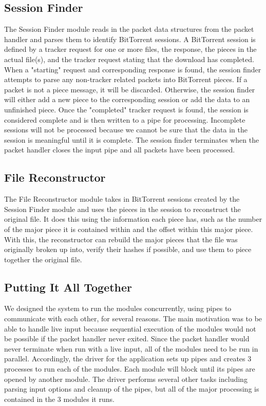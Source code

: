 \documentclass{acm_proc_article-sp}
\begin{document}
\subsection{Session Finder}
The Session Finder module reads in the packet data structures from the packet
handler and parses them to identify BitTorrent sessions. A BitTorrent session is
defined by a tracker request for one or more files, the response, the pieces in
the actual file(s), and the tracker request stating that the download has
completed. When a "starting" request and corresponding response is found, the
session finder attempts to parse any non-tracker related packets into BitTorrent
pieces. If a packet is not a piece message, it will be discarded. Otherwise, the
session finder will either add a new piece to the corresponding session or add
the data to an unfinished piece. Once the "completed" tracker request is found,
the session is considered complete and is then written to a pipe for
processing. Incomplete sessions will not be processed because we cannot be sure
that the data in the session is meaningful until it is complete. The session
finder terminates when the packet handler closes the input pipe and all packets
have been processed.

\subsection{File Reconstructor}
The File Reconstructor module takes in BitTorrent sessions created by the
Session Finder module and uses the pieces in the session to reconstruct the
original file.  It does this using the information each piece has, such as the
number of the major piece it is contained within and the offset within this
major piece.  With this, the reconstructor can rebuild the major pieces that the
file was originally broken up into, verify their hashes if possible, and use
them to piece together the original file.

\subsection{Putting It All Together}
We designed the system to run the modules concurrently, using pipes to
communicate with each other, for several reasons. The main motivation was to be
able to handle live input because sequential execution of the modules would not
be possible if the packet handler never exited. Since the packet handler would
never terminate when run with a live input, all of the modules need to be run in
parallel. Accordingly, the driver for the application sets up pipes and creates
3 processes to run each of the modules. Each module will block until its pipes
are opened by another module. The driver performs several other tasks including
parsing input options and cleanup of the pipes, but all of the major processing
is contained in the 3 modules it runs.
\end{document}
